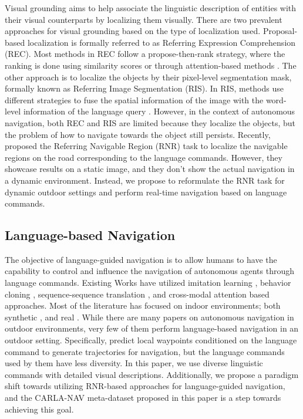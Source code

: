 \documentclass[11pt]{article}
\begin{document}
Visual grounding aims to help associate the linguistic description of entities with their visual counterparts by localizing them visually. There are two prevalent approaches for visual grounding based on the type of localization used. Proposal-based localization is formally referred to as Referring Expression Comprehension (REC). Most methods in REC follow a propose-then-rank strategy, where the ranking is done using similarity scores \cite{rohrbach2016grounding, hu2016natural, plummer2018conditional, rufus2020cosine} or through attention-based methods \cite{deng2018visual, zhang2018grounding, yang2019dynamic, qiu2020language}. The other approach is to localize the objects by their pixel-level segmentation mask, formally known as Referring Image Segmentation (RIS). In RIS, methods use different strategies to fuse the spatial information of the image with the word-level information of the language query \cite{shi2018key, ye2019cross, huang2020referring, jain2021comprehensive}. However, in the context of autonomous navigation, both REC and RIS are limited because they localize the objects, but the problem of how to navigate towards the object still persists. Recently, \cite{Rufus_2021} proposed the Referring Navigable Region (RNR) task to localize the navigable regions on the road corresponding to the language commands. However, they showcase results on a static image, and they don't show the actual navigation in a dynamic environment. Instead, we propose to reformulate the RNR task for dynamic outdoor settings and perform real-time navigation based on language commands.

\subsection{Language-based Navigation}

The objective of language-guided navigation is to allow humans to have the capability to control and influence the navigation of autonomous agents through language commands. Existing Works have utilized imitation learning \cite{nguyen2019vision, nguyen2019help}, behavior cloning \cite{das2018neural}, sequence-sequence translation \cite{anderson2018vision}, and cross-modal attention \cite{huang2019multi, irshad2021hierarchical, cornia2019perceive} based approaches. Most of the literature has focused on indoor environments; both synthetic \cite{kempka2016vizdoom, kolve2017ai2, wu2018building}, and real \cite{chang2017matterport3d, anderson2018vision}. While there are many papers \cite{mirowski2018learning, chen2019touchdown, chancan2020citylearn} on autonomous navigation in outdoor environments, very few of them \cite{sriram2019talk} perform language-based navigation in an outdoor setting. Specifically, \cite{sriram2019talk} predict local waypoints conditioned on the language command to generate trajectories for navigation, but the language commands used by them have less diversity. In this paper, we use diverse linguistic commands with detailed visual descriptions. Additionally, we propose a paradigm shift towards utilizing RNR-based approaches for language-guided navigation, and the CARLA-NAV meta-dataset proposed in this paper is a step towards achieving this goal. 
\end{document}

